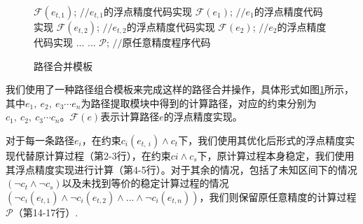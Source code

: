 \begin{figure}[hb]
  \begin{algorithmic}[1]
      \STATE$\mathcal{F}(e_{t,1})$;  \hfill {{\footnotesize$//$}\small $e_{t,1}$的浮点精度代码实现}
      \STATE$\mathcal{F}(e_1)$;      \hfill {{\footnotesize$//$}\small $e_{1}$的浮点精度代码实现}
    \ENDIF
      \STATE$\mathcal{F}(e_{t,2})$;  \hfill {{\footnotesize$//$}\small $e_{t,2}$的浮点精度代码实现}
      \STATE$\mathcal{F}(e_2)$;      \hfill {{\footnotesize$//$}\small $e_{2}$的浮点精度代码实现}
    \ENDIF
    \STATE... ...
      \STATE$\mathcal{P}$; \hfill {{\footnotesize$//$}\small 原任意精度程序代码}
    \ENDIF
  \end{algorithmic}
  \caption{路径合并模板} %
  \label{lst:mergetemplate}
\end{figure}


我们使用了一种路径组合模板来完成这样的路径合并操作，具体形式如图\ref{lst:mergetemplate}所示，其中$e_1,\ e_2,\ e_3 \cdots e_n$为路径提取模块中得到的计算路径，对应的约束分别为$c_1,\ c_2,\ c_3 \cdots c_n$。$\mathcal{F}(e)$表示计算路径$e$的浮点精度实现。

 对于每一条路径$e_i$，在约束$c_i(e_{t,\ i})\wedge c_t$下，我们使用其优化后形式的浮点精度实现代替原计算过程（第2-3行），在约束$ci \wedge c_s$下，原计算过程本身稳定，我们使用其浮点精度实现进行计算（第4-5行）。对于其余的情况，包括了未知区间下的情况$(\neg c_t \wedge \neg c_s)$以及未找到等价的稳定计算过程的情况$(\neg c_i(e_{t,1}) \wedge \neg c_i(e_{t,2}) \wedge ... \wedge \neg c_i(e_{t,n}))$，我们则保留原任意精度的计算过程$\mathcal{P}$（第14-17行）.


